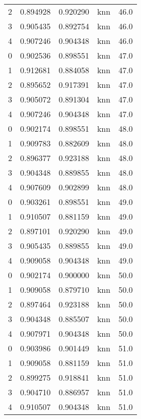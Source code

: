\begin{tabular}{rrrlr}
     2 & 0.894928 & 0.920290 &      knn &       46.0 \\
     3 & 0.905435 & 0.892754 &      knn &       46.0 \\
     4 & 0.907246 & 0.904348 &      knn &       46.0 \\
     0 & 0.902536 & 0.898551 &      knn &       47.0 \\
     1 & 0.912681 & 0.884058 &      knn &       47.0 \\
     2 & 0.895652 & 0.917391 &      knn &       47.0 \\
     3 & 0.905072 & 0.891304 &      knn &       47.0 \\
     4 & 0.907246 & 0.904348 &      knn &       47.0 \\
     0 & 0.902174 & 0.898551 &      knn &       48.0 \\
     1 & 0.909783 & 0.882609 &      knn &       48.0 \\
     2 & 0.896377 & 0.923188 &      knn &       48.0 \\
     3 & 0.904348 & 0.889855 &      knn &       48.0 \\
     4 & 0.907609 & 0.902899 &      knn &       48.0 \\
     0 & 0.903261 & 0.898551 &      knn &       49.0 \\
     1 & 0.910507 & 0.881159 &      knn &       49.0 \\
     2 & 0.897101 & 0.920290 &      knn &       49.0 \\
     3 & 0.905435 & 0.889855 &      knn &       49.0 \\
     4 & 0.909058 & 0.904348 &      knn &       49.0 \\
     0 & 0.902174 & 0.900000 &      knn &       50.0 \\
     1 & 0.909058 & 0.879710 &      knn &       50.0 \\
     2 & 0.897464 & 0.923188 &      knn &       50.0 \\
     3 & 0.904348 & 0.885507 &      knn &       50.0 \\
     4 & 0.907971 & 0.904348 &      knn &       50.0 \\
     0 & 0.903986 & 0.901449 &      knn &       51.0 \\
     1 & 0.909058 & 0.881159 &      knn &       51.0 \\
     2 & 0.899275 & 0.918841 &      knn &       51.0 \\
     3 & 0.904710 & 0.886957 &      knn &       51.0 \\
     4 & 0.910507 & 0.904348 &      knn &       51.0 \\

\end{tabular}
